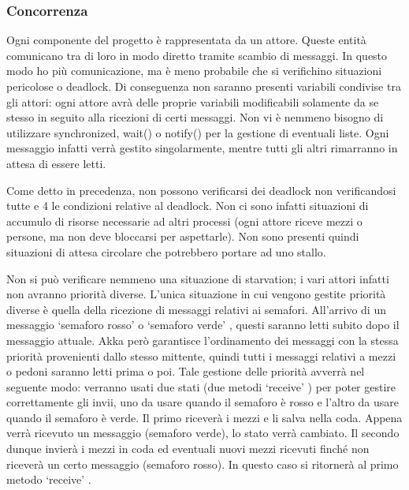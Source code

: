 \documentclass{article}
\begin{document}
\subsubsection{Concorrenza}
\label{Concorrenza}
\lettrine[lines=1]{O}{}gni componente del progetto \`{e} rappresentata da un attore. Queste entit\`{a} comunicano tra di loro in modo diretto tramite scambio di messaggi. In questo modo ho pi\`{u} comunicazione, ma \`{e} meno probabile che si verifichino situazioni pericolose o deadlock. Di conseguenza non saranno presenti variabili condivise tra gli attori: ogni attore avr\`{a} delle proprie variabili modificabili solamente da se stesso in seguito alla ricezioni di certi messaggi. Non vi \`{e} nemmeno bisogno di utilizzare synchronized, wait() o notify() per la gestione di eventuali liste. Ogni messaggio infatti verr\`{a} gestito singolarmente, mentre tutti gli altri rimarranno in attesa di essere letti.
\par Come detto in precedenza, non possono verificarsi dei deadlock non verificandosi tutte e 4 le condizioni relative al deadlock. Non ci sono infatti situazioni di accumulo di risorse necessarie ad altri processi (ogni attore riceve mezzi o persone, ma non deve bloccarsi per aspettarle). Non sono presenti quindi situazioni di attesa circolare che potrebbero portare ad uno stallo.
\par Non si pu\`{o} verificare nemmeno una situazione di starvation; i vari attori infatti non avranno priorit\`{a} diverse. L\textquoteright{}unica situazione in cui vengono gestite priorit\`{a} diverse \`{e} quella della ricezione di messaggi relativi ai semafori. All\textquoteright{}arrivo di un messaggio \lq semaforo rosso\rq{} o \lq semaforo verde\rq{} , questi saranno letti subito dopo il messaggio attuale. Akka per\`{o} garantisce l\textquoteright{}ordinamento dei messaggi con la stessa priorit\`{a} provenienti dallo stesso mittente, quindi tutti i messaggi relativi a mezzi o pedoni saranno letti prima o poi.
Tale gestione delle priorit\`{a} avverr\`{a} nel seguente modo: verranno usati due stati (due metodi \lq receive\rq{} ) per poter gestire correttamente gli invii, uno da usare quando il semaforo \`{e} rosso e l\textquoteright{}altro da usare quando il semaforo \`{e} verde. Il primo ricever\`{a} i mezzi e li salva nella coda. Appena verr\`{a} ricevuto un messaggio (semaforo verde), lo stato verr\`{a} cambiato. Il secondo dunque invier\`{a} i mezzi in coda ed eventuali nuovi mezzi ricevuti finch\'{e} non ricever\`{a} un certo messaggio (semaforo rosso). In questo caso si ritorner\`{a} al primo metodo \lq receive\rq{} .
\end{document}
